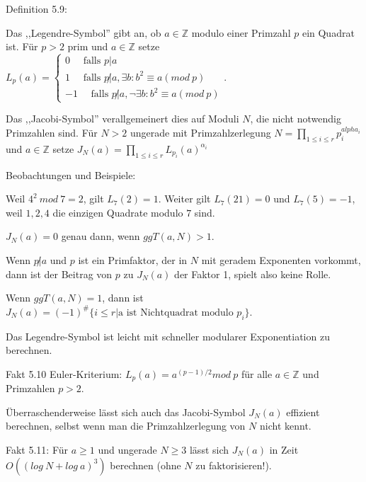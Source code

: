 \documentclass[a4paper]{article}
\begin{document}
\begin{multicols}{3}
        Definition 5.9:
        \begin{enumerate*}
            \item Das ,,Legendre-Symbol'' gibt an, ob $a\in\mathbb{Z}$ modulo einer Primzahl $p$ ein Quadrat ist. Für $p>2$ prim und $a\in\mathbb{Z}$ setze $L_p(a) =\begin{cases} 0 \quad\text{ falls } p|a \\ 1 \quad\text{ falls } p\not|a, \exists b:b^2 \equiv a (mod\ p) \\ -1 \quad\text{ falls } p\not|a, \lnot\exists b:b^2 \equiv a (mod\ p)\end{cases}$.
            \item Das ,,Jacobi-Symbol'' verallgemeinert dies auf Moduli $N$, die nicht notwendig Primzahlen sind. Für $N>2$ ungerade mit Primzahlzerlegung $N=\prod_{1\leq i\leq r} p^{alpha_i}_i$ und $a\in\mathbb{Z}$ setze $J_N(a) =\prod_{1 \leq i\leq r} L_{p_i}(a)^{\alpha_i}$
        \end{enumerate*}

        Beobachtungen und Beispiele:
        \begin{itemize*}
            \item Weil $4^2\ mod\ 7 = 2$, gilt $L_7(2) = 1$. Weiter gilt $L_7(21) = 0$ und $L_7(5) =-1$, weil $1,2,4$ die einzigen Quadrate modulo $7$ sind.
            \item $J_N(a) = 0$ genau dann, wenn $ggT(a,N)>1$.
            \item Wenn $p\not|a$ und $p$ ist ein Primfaktor, der in $N$ mit geradem Exponenten vorkommt, dann ist der Beitrag von $p$ zu $J_N(a)$ der Faktor 1, spielt also keine Rolle.
            \item Wenn $ggT(a,N) = 1$, dann ist $J_N(a) = (-1)^{\#}\{i\leq r|\text{a ist Nichtquadrat modulo } p_i\}$.
        \end{itemize*}

        Das Legendre-Symbol ist leicht mit schneller modularer Exponentiation zu berechnen.

        Fakt 5.10 Euler-Kriterium: $L_p(a) =a^{(p-1)/ 2}mod\ p$ für alle $a\in\mathbb{Z}$ und Primzahlen $p>2$.

        Überraschenderweise lässt sich auch das Jacobi-Symbol $J_N(a)$ effizient berechnen, selbst wenn man die Primzahlzerlegung von $N$ nicht kennt.

        Fakt 5.11: Für $a\geq 1$ und ungerade $N\geq 3$ lässt sich $J_N(a)$ in Zeit $O((log\ N+log\ a)^3)$ berechnen (ohne $N$ zu faktorisieren!).


\end{multicols}
\end{document}
